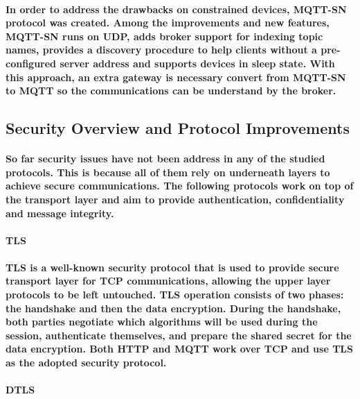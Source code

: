 \paragraph{
	In order to address the drawbacks on constrained devices, \ac{MQTT-SN} protocol\cite{Ibm2013} was created. Among the improvements and new features, \ac{MQTT-SN} runs on UDP, adds broker support for indexing topic names, provides a discovery procedure to help clients without a pre-configured server address and supports devices in sleep state. With this approach, an extra gateway is necessary convert from \ac{MQTT-SN} to \ac{MQTT} so the communications can be understand by the broker.
}


\subsection{Security Overview and Protocol Improvements}

\paragraph{
	So far security issues have not been address in any of the studied protocols. This is because all of them rely on underneath layers to achieve secure communications. The following protocols work on top of the transport layer and aim to provide authentication, confidentiality and message integrity.
}

\paragraph{\textbf{\ac{TLS}}}
\paragraph{
	\ac{TLS} is a well-known security protocol that is used to provide secure transport layer for \ac{TCP} communications, allowing the upper layer protocols to be left untouched. \ac{TLS} operation consists of two phases: the handshake and then the data encryption. During the handshake, both parties negotiate which algorithms will be used during the session, authenticate themselves, and prepare the shared secret for the data encryption.
	Both \ac{HTTP} and \ac{MQTT} work over \ac{TCP} and use \ac{TLS} as the adopted security protocol.
}

\paragraph{\textbf{\ac{DTLS}}}
